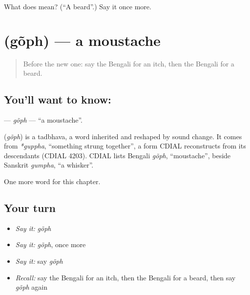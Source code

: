 \begin{tcolorbox}[breakable,colback=teal!4,colframe=teal!35!black,title={Before you move on}]
What does  mean? (\textquotedblleft{}A beard\textquotedblright{}.) Say it once more.
\end{tcolorbox}
\section[\texorpdfstring{\bn{গোঁফ} (gõph)}{গোঁফ (gõph)}]{ (gõph) — a moustache}

\label{lesson:BN-C243-goph}



\begin{quote}
Before the new one: say the Bengali for an itch, then the Bengali for a beard.
\end{quote}

\subsection*{You'll want to know: }
\textbf{} — \emph{gõph} — \textquotedblleft{}a moustache\textquotedblright{}.

\begin{cousinweb}
\textbf{} (\emph{gõph}) is a tadbhava, a word inherited and reshaped by sound change. It comes from \emph{*guppha}, \textquotedblleft{}something strung together\textquotedblright{}, a form CDIAL reconstructs from its descendants (CDIAL 4203). CDIAL lists Bengali \emph{gõph}, \textquotedblleft{}moustache\textquotedblright{}, beside Sanskrit \emph{gumpha}, \textquotedblleft{}a whisker\textquotedblright{}.
\end{cousinweb}

\begin{grammarlens}[title={What you've built}]
One more word for this chapter.
\end{grammarlens}

\subsection*{Your turn}
\begin{itemize}
\raggedright
  \item \emph{Say it:} \emph{gõph}
  \item \emph{Say it:} \emph{gõph}, once more
  \item \emph{Say it:} say \emph{gõph}
  \item \emph{Recall:} say the Bengali for an itch, then the Bengali for a beard, then say \emph{gõph} again
\end{itemize}

